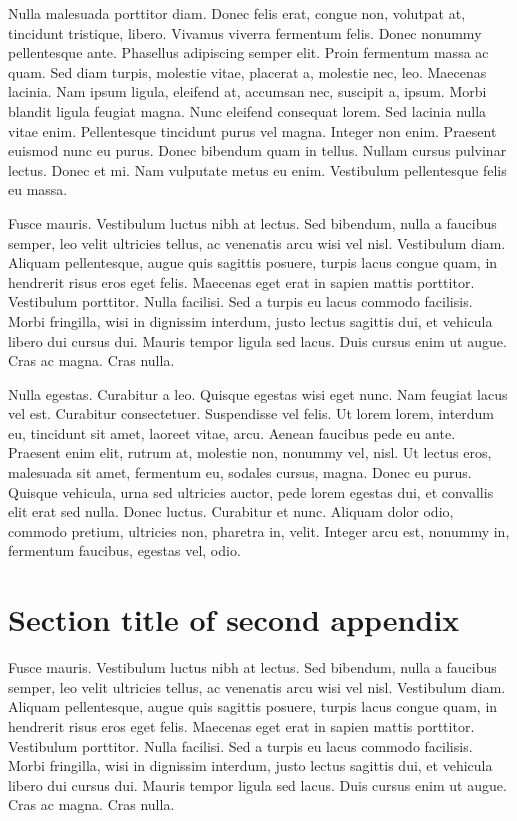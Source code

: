 \documentclass[CJCE,STIX2COL]{WileyNJD-v2}
\begin{document}
Nulla malesuada porttitor diam. Donec felis erat, congue non, volutpat at, tincidunt tristique, libero. Vivamus
viverra fermentum felis. Donec nonummy pellentesque ante. Phasellus adipiscing semper elit. Proin fermentum massa
ac quam. Sed diam turpis, molestie vitae, placerat a, molestie nec, leo. Maecenas lacinia. Nam ipsum ligula, eleifend
at, accumsan nec, suscipit a, ipsum. Morbi blandit ligula feugiat magna. Nunc eleifend consequat lorem. Sed lacinia
nulla vitae enim. Pellentesque tincidunt purus vel magna. Integer non enim. Praesent euismod nunc eu purus. Donec
bibendum quam in tellus. Nullam cursus pulvinar lectus. Donec et mi. Nam vulputate metus eu enim. Vestibulum
pellentesque felis eu massa.

Fusce mauris. Vestibulum luctus nibh at lectus. Sed bibendum, nulla a faucibus semper, leo velit ultricies tellus, ac
venenatis arcu wisi vel nisl. Vestibulum diam. Aliquam pellentesque, augue quis sagittis posuere, turpis lacus congue
quam, in hendrerit risus eros eget felis. Maecenas eget erat in sapien mattis porttitor. Vestibulum porttitor. Nulla
facilisi. Sed a turpis eu lacus commodo facilisis. Morbi fringilla, wisi in dignissim interdum, justo lectus sagittis dui, et
vehicula libero dui cursus dui. Mauris tempor ligula sed lacus. Duis cursus enim ut augue. Cras ac magna. Cras nulla.

Nulla egestas. Curabitur a leo. Quisque egestas wisi eget nunc. Nam feugiat lacus vel est. Curabitur consectetuer.
Suspendisse vel felis. Ut lorem lorem, interdum eu, tincidunt sit amet, laoreet vitae, arcu. Aenean faucibus pede eu
ante. Praesent enim elit, rutrum at, molestie non, nonummy vel, nisl. Ut lectus eros, malesuada sit amet, fermentum
eu, sodales cursus, magna. Donec eu purus. Quisque vehicula, urna sed ultricies auctor, pede lorem egestas dui, et
convallis elit erat sed nulla. Donec luctus. Curabitur et nunc. Aliquam dolor odio, commodo pretium, ultricies non,
pharetra in, velit. Integer arcu est, nonummy in, fermentum faucibus, egestas vel, odio.

\section{Section title of second appendix\label{app2}}%

Fusce mauris. Vestibulum luctus nibh at lectus. Sed bibendum, nulla a faucibus semper, leo velit ultricies tellus, ac
venenatis arcu wisi vel nisl. Vestibulum diam. Aliquam pellentesque, augue quis sagittis posuere, turpis lacus congue
quam, in hendrerit risus eros eget felis. Maecenas eget erat in sapien mattis porttitor. Vestibulum porttitor. Nulla
facilisi. Sed a turpis eu lacus commodo facilisis. Morbi fringilla, wisi in dignissim interdum, justo lectus sagittis dui, et
vehicula libero dui cursus dui. Mauris tempor ligula sed lacus. Duis cursus enim ut augue. Cras ac magna. Cras nulla.
\end{document}
